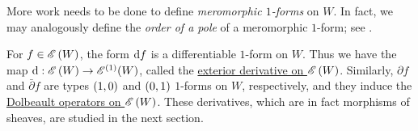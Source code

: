 \documentclass[../Moduli_Spaces_of_Riemann_Surfaces.tex]{subfiles}
\begin{document}
    \begin{remark}
        More work needs to be done to define \textit{meromorphic $1$-forms} on $W$. In fact, we may analogously define the \textit{order of a pole} of a meromorphic $1$-form; see \cite[][Section 9.9]{forster}.\exqed
    \end{remark}
    \begin{example}
        For $f\in\mathscr{E}\left(W\right)$, the form $\mathrm{d} f$ is a differentiable $1$-form on $W$. Thus we have the map $\mathrm{d}:\mathscr{E}\left(W\right)\to\mathscr{E}^{\left(1\right)}\!\left(W\right)$, called the \ul{exterior derivative on $\mathscr{E}\left(W\right)$}. Similarly, $\partial f$ and $\bar{\partial}f$ are types $\left(1,0\right)$ and $\left(0,1\right)$ $1$-forms on $W$, respectively, and they induce the \ul{Dolbeault operators on $\mathscr{E}\left(W\right)$}. These derivatives, which are in fact morphisms of sheaves, are studied in the next section.\exqed
    \end{example}
    \pagebreak
\end{document}

